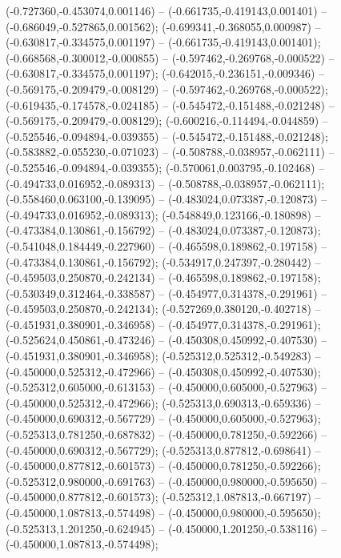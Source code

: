  (-0.727360,-0.453074,0.001146) -- (-0.661735,-0.419143,0.001401) -- (-0.686049,-0.527865,0.001562);
 (-0.699341,-0.368055,0.000987) -- (-0.630817,-0.334575,0.001197) -- (-0.661735,-0.419143,0.001401);
 (-0.668568,-0.300012,-0.000855) -- (-0.597462,-0.269768,-0.000522) -- (-0.630817,-0.334575,0.001197);
 (-0.642015,-0.236151,-0.009346) -- (-0.569175,-0.209479,-0.008129) -- (-0.597462,-0.269768,-0.000522);
 (-0.619435,-0.174578,-0.024185) -- (-0.545472,-0.151488,-0.021248) -- (-0.569175,-0.209479,-0.008129);
 (-0.600216,-0.114494,-0.044859) -- (-0.525546,-0.094894,-0.039355) -- (-0.545472,-0.151488,-0.021248);
 (-0.583882,-0.055230,-0.071023) -- (-0.508788,-0.038957,-0.062111) -- (-0.525546,-0.094894,-0.039355);
 (-0.570061,0.003795,-0.102468) -- (-0.494733,0.016952,-0.089313) -- (-0.508788,-0.038957,-0.062111);
 (-0.558460,0.063100,-0.139095) -- (-0.483024,0.073387,-0.120873) -- (-0.494733,0.016952,-0.089313);
 (-0.548849,0.123166,-0.180898) -- (-0.473384,0.130861,-0.156792) -- (-0.483024,0.073387,-0.120873);
 (-0.541048,0.184449,-0.227960) -- (-0.465598,0.189862,-0.197158) -- (-0.473384,0.130861,-0.156792);
 (-0.534917,0.247397,-0.280442) -- (-0.459503,0.250870,-0.242134) -- (-0.465598,0.189862,-0.197158);
 (-0.530349,0.312464,-0.338587) -- (-0.454977,0.314378,-0.291961) -- (-0.459503,0.250870,-0.242134);
 (-0.527269,0.380120,-0.402718) -- (-0.451931,0.380901,-0.346958) -- (-0.454977,0.314378,-0.291961);
 (-0.525624,0.450861,-0.473246) -- (-0.450308,0.450992,-0.407530) -- (-0.451931,0.380901,-0.346958);
 (-0.525312,0.525312,-0.549283) -- (-0.450000,0.525312,-0.472966) -- (-0.450308,0.450992,-0.407530);
 (-0.525312,0.605000,-0.613153) -- (-0.450000,0.605000,-0.527963) -- (-0.450000,0.525312,-0.472966);
 (-0.525313,0.690313,-0.659336) -- (-0.450000,0.690312,-0.567729) -- (-0.450000,0.605000,-0.527963);
 (-0.525313,0.781250,-0.687832) -- (-0.450000,0.781250,-0.592266) -- (-0.450000,0.690312,-0.567729);
 (-0.525313,0.877812,-0.698641) -- (-0.450000,0.877812,-0.601573) -- (-0.450000,0.781250,-0.592266);
 (-0.525312,0.980000,-0.691763) -- (-0.450000,0.980000,-0.595650) -- (-0.450000,0.877812,-0.601573);
 (-0.525312,1.087813,-0.667197) -- (-0.450000,1.087813,-0.574498) -- (-0.450000,0.980000,-0.595650);
 (-0.525313,1.201250,-0.624945) -- (-0.450000,1.201250,-0.538116) -- (-0.450000,1.087813,-0.574498);
